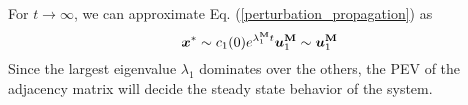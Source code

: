 \documentclass[aps, prd, showpacs, floatfix, superscriptaddress, twocolumn, nofootinbib, preprintnumbers, longbibliography]{revtex4-2}
\begin{document}
For $t \rightarrow \infty$, we can approximate Eq. (\ref{perturbation_propagation}) as  
%
\begin{equation}
\bm{x}^{*} \sim c_1(0)e^{\lambda_1^{\bf M}t}\bm{u}_1^{\bf M} \sim \bm{u}_1^{\bf M}
\end{equation}
%
Since the largest eigenvalue $\lambda_{1}$ dominates over the others, the PEV of the adjacency matrix will decide the steady state behavior of the system. 
\end{document}
